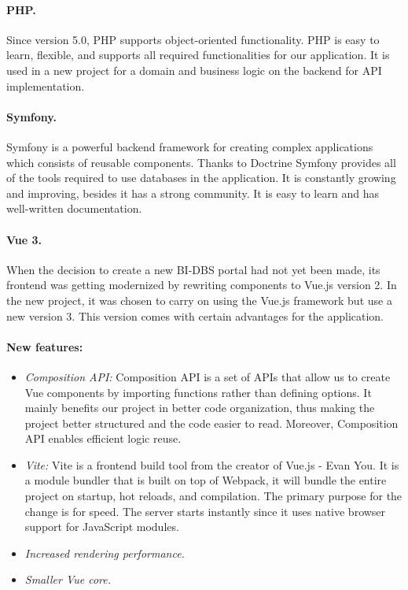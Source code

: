 \paragraph*{PHP.} Since version 5.0, PHP supports object-oriented functionality\cite{php-oop}. PHP is easy to learn, flexible, and supports all required functionalities for our application. It is used in a new project for a domain and business logic on the backend for API implementation.

\paragraph*{Symfony.} Symfony is a powerful backend framework for creating complex applications which consists of reusable components.\cite{symphony-doc} Thanks to Doctrine Symfony provides all of the tools required to use databases in the application. It is constantly growing and improving, besides it has a strong community. It is easy to learn and has well-written documentation.


\paragraph*{Vue 3.} When the decision to create a new BI-DBS portal had not yet been made, its frontend was getting modernized by rewriting components to Vue.js version 2. In the new project, it was chosen to carry on using the Vue.js framework but use a new version 3. This version comes with certain advantages for the application.\cite{vue3-updates}

\paragraph*{New features:}
\begin{itemize}
  \item \emph{Composition API:} Composition API is a set of APIs that allow us to create Vue components by importing functions rather than defining options. It mainly benefits our project in better code organization, thus making the project better structured and the code easier to read. Moreover, Composition API enables efficient logic reuse.\cite{compositionapi-doc}
  
  \item \emph{Vite:} Vite is a frontend build tool from the creator of Vue.js - Evan You. It is a module bundler that is built on top of Webpack, it will bundle the entire project on startup, hot reloads, and compilation. The primary purpose for the change is for speed. The server starts instantly since it uses native browser support for JavaScript modules.\cite{vite-doc}

  \item \emph{Increased rendering performance.}

  \item \emph{Smaller Vue core.}

\end{itemize}

